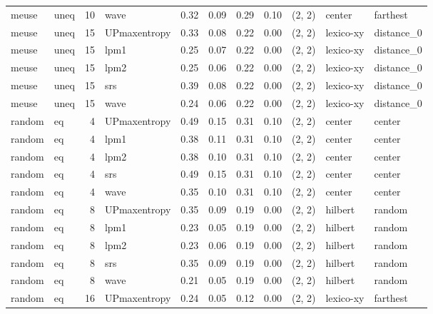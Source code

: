 \begin{tabular}{llrlrrrrlll}
 meuse &  uneq & 10 &         wave &  0.32 &     0.09 &   0.29 &       0.10 & (2, 2) &      center &   farthest \\
 meuse &  uneq & 15 & UPmaxentropy &  0.33 &     0.08 &   0.22 &       0.00 & (2, 2) &   lexico-xy & distance_0 \\
 meuse &  uneq & 15 &         lpm1 &  0.25 &     0.07 &   0.22 &       0.00 & (2, 2) &   lexico-xy & distance_0 \\
 meuse &  uneq & 15 &         lpm2 &  0.25 &     0.06 &   0.22 &       0.00 & (2, 2) &   lexico-xy & distance_0 \\
 meuse &  uneq & 15 &          srs &  0.39 &     0.08 &   0.22 &       0.00 & (2, 2) &   lexico-xy & distance_0 \\
 meuse &  uneq & 15 &         wave &  0.24 &     0.06 &   0.22 &       0.00 & (2, 2) &   lexico-xy & distance_0 \\
random &    eq &  4 & UPmaxentropy &  0.49 &     0.15 &   0.31 &       0.10 & (2, 2) &      center &     center \\
random &    eq &  4 &         lpm1 &  0.38 &     0.11 &   0.31 &       0.10 & (2, 2) &      center &     center \\
random &    eq &  4 &         lpm2 &  0.38 &     0.10 &   0.31 &       0.10 & (2, 2) &      center &     center \\
random &    eq &  4 &          srs &  0.49 &     0.15 &   0.31 &       0.10 & (2, 2) &      center &     center \\
random &    eq &  4 &         wave &  0.35 &     0.10 &   0.31 &       0.10 & (2, 2) &      center &     center \\
random &    eq &  8 & UPmaxentropy &  0.35 &     0.09 &   0.19 &       0.00 & (2, 2) &     hilbert &     random \\
random &    eq &  8 &         lpm1 &  0.23 &     0.05 &   0.19 &       0.00 & (2, 2) &     hilbert &     random \\
random &    eq &  8 &         lpm2 &  0.23 &     0.06 &   0.19 &       0.00 & (2, 2) &     hilbert &     random \\
random &    eq &  8 &          srs &  0.35 &     0.09 &   0.19 &       0.00 & (2, 2) &     hilbert &     random \\
random &    eq &  8 &         wave &  0.21 &     0.05 &   0.19 &       0.00 & (2, 2) &     hilbert &     random \\
random &    eq & 16 & UPmaxentropy &  0.24 &     0.05 &   0.12 &       0.00 & (2, 2) &   lexico-xy &   farthest \\

\end{tabular}
